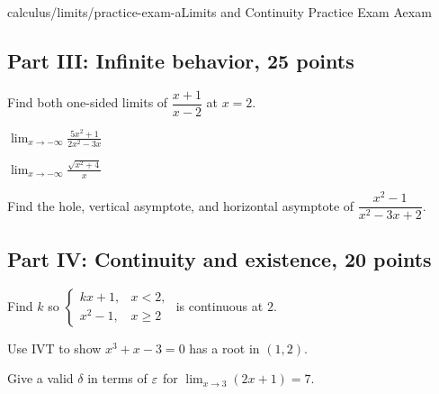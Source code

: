 \begin{webpage}{calculus/limits/practice-exam-a}{Limits and Continuity Practice Exam A}{exam}
\subsection*{Part III: Infinite behavior, 25 points}
\begin{bgexercises}[label=\textbf{A\arabic*.},resume]
  \item Find both one-sided limits of \(\dfrac{x+1}{x-2}\) at \(x=2\).
  \item \(\displaystyle\lim_{x\to-\infty}\frac{5x^2+1}{2x^2-3x}\)
  \item \(\displaystyle\lim_{x\to-\infty}\frac{\sqrt{x^2+4}}x\)
  \item Find the hole, vertical asymptote, and horizontal asymptote of \(\dfrac{x^2-1}{x^2-3x+2}\).
\end{bgexercises}

\subsection*{Part IV: Continuity and existence, 20 points}
\begin{bgexercises}[label=\textbf{A\arabic*.},resume]
  \item Find \(k\) so \(\begin{cases}kx+1,&x<2,\\x^2-1,&x\ge2\end{cases}\) is continuous at \(2\).
  \item Use IVT to show \(x^3+x-3=0\) has a root in \((1,2)\).
  \item Give a valid \(\delta\) in terms of \(\varepsilon\) for \(\lim_{x\to3}(2x+1)=7\).
\end{bgexercises}
\end{webpage}

